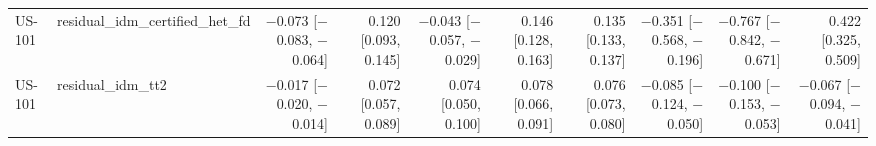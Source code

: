 \begin{table}[htbp]
{\begin{tabular}{llrrrrrrrr}
US-101 & residual\_idm\_certified\_het\_fd & $-$0.073 [$-$0.083, $-$0.064] & 0.120 [0.093, 0.145] & $-$0.043 [$-$0.057, $-$0.029] & 0.146 [0.128, 0.163] & 0.135 [0.133, 0.137] & $-$0.351 [$-$0.568, $-$0.196] & $-$0.767 [$-$0.842, $-$0.671] & 0.422 [0.325, 0.509] \\
US-101 & residual\_idm\_tt2 & $-$0.017 [$-$0.020, $-$0.014] & 0.072 [0.057, 0.089] & 0.074 [0.050, 0.100] & 0.078 [0.066, 0.091] & 0.076 [0.073, 0.080] & $-$0.085 [$-$0.124, $-$0.050] & $-$0.100 [$-$0.153, $-$0.053] & $-$0.067 [$-$0.094, $-$0.041] \\
\bottomrule
\end{tabular}
}
\end{table}
